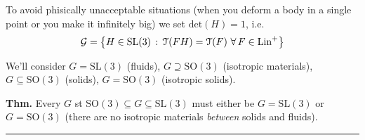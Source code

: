 \smallskip 

To avoid phisically unacceptable situations (when you deform a body in a single point or you make it infinitely big) we set $\text{det}(H)=1$, i.e.
\begin{equation*}
\mathcal{G}=\left\{ H\in\text{SL}(3)\,:\,\EuScript{T}(FH)=\EuScript{T}(F)\ \forall\, F\in \text{Lin}^+ \right\}
\end{equation*}

We'll consider $G=\text{SL}(3)$ (fluids), $G\supseteq\text{SO}(3)$ (isotropic materials), $G\subseteq \text{SO}(3)$ (solids), $G=\text{SO}(3)$ (isotropic solids).

\smallskip 

\textbf{Thm.} Every $G$ st $\text{SO}(3)\subseteq G \subseteq \text{SL}(3)$ must either be $G=\text{SL}(3)$ or $G=\text{SO}(3)$ (there are no isotropic materials \emph{between} solids and fluids).  

\rule{0.31\textwidth}{1pt}

